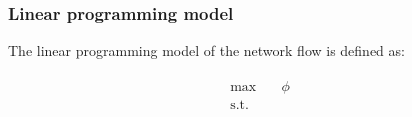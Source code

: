 \documentclass[english]{article}
\begin{document}
\subsubsection{Linear programming model}

The linear programming model of the network flow is defined as:

\begin{gather}
  \begin{aligned}
    \max \quad        & \phi \\
    \text{s.t.} \quad &
  \end{aligned}
\end{gather}

\end{document}

